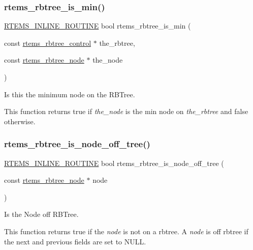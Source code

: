 \subsubsection{\texorpdfstring{rtems\_rbtree\_is\_min()}{rtems\_rbtree\_is\_min()}}
{\footnotesize\ttfamily \mbox{\hyperlink{group__RTEMSScoreBaseDefs_gac216239df231d5dbd15e3520b0b9313f}{R\+T\+E\+M\+S\+\_\+\+I\+N\+L\+I\+N\+E\+\_\+\+R\+O\+U\+T\+I\+NE}} bool rtems\+\_\+rbtree\+\_\+is\+\_\+min (\begin{DoxyParamCaption}\item[{const \mbox{\hyperlink{group__ClassicRBTrees_ga21fe446d0b3cb8b25c814e93357753ef}{rtems\+\_\+rbtree\+\_\+control}} $\ast$}]{the\+\_\+rbtree,  }\item[{const \mbox{\hyperlink{group__ClassicRBTrees_gaef47fc7fc61856c9afbf7f18a26ff80d}{rtems\+\_\+rbtree\+\_\+node}} $\ast$}]{the\+\_\+node }\end{DoxyParamCaption})}



Is this the minimum node on the R\+B\+Tree. 

This function returns true if {\itshape the\+\_\+node} is the min node on {\itshape the\+\_\+rbtree} and false otherwise. \mbox{\label{group__ClassicRBTrees_ga3effd176d616ee063b3619ce6aeba0ad}} 
\subsubsection{\texorpdfstring{rtems\_rbtree\_is\_node\_off\_tree()}{rtems\_rbtree\_is\_node\_off\_tree()}}
{\footnotesize\ttfamily \mbox{\hyperlink{group__RTEMSScoreBaseDefs_gac216239df231d5dbd15e3520b0b9313f}{R\+T\+E\+M\+S\+\_\+\+I\+N\+L\+I\+N\+E\+\_\+\+R\+O\+U\+T\+I\+NE}} bool rtems\+\_\+rbtree\+\_\+is\+\_\+node\+\_\+off\+\_\+tree (\begin{DoxyParamCaption}\item[{const \mbox{\hyperlink{group__ClassicRBTrees_gaef47fc7fc61856c9afbf7f18a26ff80d}{rtems\+\_\+rbtree\+\_\+node}} $\ast$}]{node }\end{DoxyParamCaption})}



Is the Node off R\+B\+Tree. 

This function returns true if the {\itshape node} is not on a rbtree. A {\itshape node} is off rbtree if the next and previous fields are set to N\+U\+LL. \mbox{\label{group__ClassicRBTrees_ga25be479d0108ca0c55d179f99cb18f71}} 
